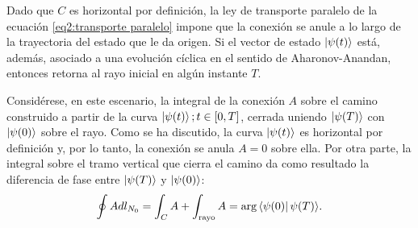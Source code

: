 Dado que \( C \) es horizontal por definición, la ley de transporte paralelo de la ecuación \ref{eq2:transporte paralelo} impone que la conexión se anule a lo largo de la trayectoria del estado que le da origen. Si el vector de estado \( \ket{\psi(t)} \) está, además, asociado a una evolución cíclica en el sentido de Aharonov-Anandan, entonces retorna al rayo inicial en algún instante \( T \).

Considérese, en este escenario, la integral de la conexión \( A \) sobre el camino construido a partir de la curva \( \ket{\psi(t)} ; t \in [0, T] \), cerrada uniendo \( \ket{\psi(T)} \) con \( \ket{\psi(0)} \) sobre el rayo. Como se ha discutido, la curva \( \ket{\psi(t)} \) es horizontal por definición y, por lo tanto, la conexión se anula \( A = 0 \) sobre ella. Por otra parte, la integral sobre el tramo vertical que cierra el camino da como resultado la diferencia de fase entre \( \ket{\psi(T)} \) y \( \ket{\psi(0)} \):
\begin{equation}
\oint A dl_{N_0} = \int_C A + \int_{\text{rayo}} A = \text{arg} \bra{\psi(0)} \psi(T) \rangle.
\end{equation}

